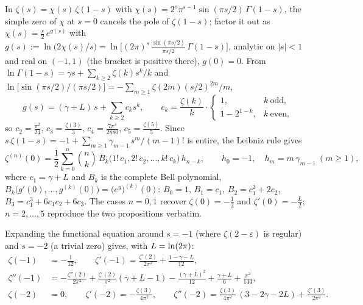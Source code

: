 \begin{remark}\label{stieltjes:rem:jetrec}
In $\zeta(s)=\chi(s)\,\zeta(1-s)$ with
$\chi(s)=2^s\pi^{s-1}\sin(\pi s/2)\,\Gamma(1-s)$,
the simple zero of $\chi$ at $s=0$ cancels the pole of $\zeta(1-s)$; factor
it out as $\chi(s)=\tfrac{s}{2}\,e^{g(s)}$ with
$g(s):=\ln\bigl(2\chi(s)/s\bigr)
=\ln\bigl[(2\pi)^s\,\tfrac{\sin(\pi s/2)}{\pi s/2}\,\Gamma(1-s)\bigr]$,
analytic on $|s|<1$ and real on $(-1,1)$ (the bracket is positive there),
$g(0)=0$. From $\ln\Gamma(1-s)=\gamma s+\sum_{k\ge2}\zeta(k)s^k/k$ and
$\ln\bigl[\sin(\pi s/2)\big/(\pi s/2)\bigr]=-\sum_{m\ge1}\zeta(2m)(s/2)^{2m}/m$,
\[
g(s)=(\gamma+L)\,s+\sum_{k\ge2}c_k s^k,\qquad
c_k=\frac{\zeta(k)}{k}\cdot\begin{cases}1,&k\ \text{odd},\\
1-2^{1-k},&k\ \text{even},\end{cases}
\]
so $c_2=\tfrac{\pi^2}{24}$, $c_3=\tfrac{\zeta(3)}{3}$,
$c_4=\tfrac{7\pi^4}{2880}$, $c_5=\tfrac{\zeta(5)}{5}$. Since
$s\,\zeta(1-s)=-1+\sum_{m\ge1}\gamma_{m-1}\,s^m/(m-1)!$ is entire, the
Leibniz rule gives
\[
\zeta^{(n)}(0)=\frac12\sum_{k=0}^{n}\binom{n}{k}\,
B_k\bigl(1!\,c_1,2!\,c_2,\dots,k!\,c_k\bigr)\,h_{n-k},
\qquad h_0=-1,\quad h_m=m\,\gamma_{m-1}\ (m\ge1),
\]
where $c_1=\gamma+L$ and $B_k$ is the complete Bell polynomial,
$B_k\bigl(g'(0),\dots,g^{(k)}(0)\bigr)=\bigl(e^{g}\bigr)^{(k)}(0)$: $B_0=1$,
$B_1=c_1$, $B_2=c_1^2+2c_2$, $B_3=c_1^3+6c_1c_2+6c_3$. The cases $n=0,1$
recover $\zeta(0)=-\tfrac12$ and $\zeta'(0)=-\tfrac{L}{2}$; $n=2,\dots,5$
reproduce the two propositions verbatim.
\end{remark}

\begin{proposition}\label{stieltjes:prop:jetsneg}
Expanding the functional equation around $s=-1$ (where $\zeta(2-\varepsilon)$
is regular) and $s=-2$ (a trivial zero) gives, with $L=\ln(2\pi)$:
\begin{align}
\zeta(-1)&=-\tfrac1{12},\qquad
\zeta'(-1)=\frac{\zeta'(2)}{2\pi^2}+\frac{1-\gamma-L}{12},\label{stieltjes:eq:zpm1}\\
\zeta''(-1)&=-\frac{\zeta''(2)}{2\pi^2}+\frac{\zeta'(2)}{\pi^2}(\gamma+L-1)
-\frac{(\gamma+L)^2}{12}+\frac{\gamma+L}{6}+\frac{\pi^2}{144},\label{stieltjes:eq:zppm1}\\
\zeta(-2)&=0,\qquad
\zeta'(-2)=-\frac{\zeta(3)}{4\pi^2},\qquad
\zeta''(-2)=\frac{\zeta(3)}{4\pi^2}\,(3-2\gamma-2L)+\frac{\zeta'(3)}{2\pi^2}.
\label{stieltjes:eq:zm2}
\end{align}
\end{proposition}

